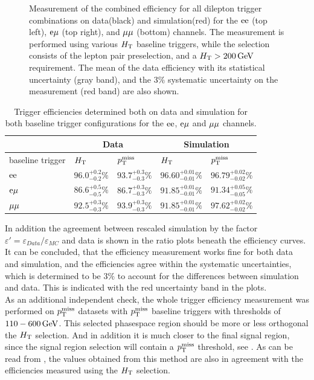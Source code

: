 \begin{figure}[htb]
 \caption{Measurement of the combined efficiency for all dilepton trigger combinations on data(black) and simulation(red) for the $\mathrm{e}\mathrm{e}$ (top left), $\mathrm{e}\mu$ (top right), and $\mu\mu$ (bottom) channels. The measurement is performed using various $H_{\mathrm{T}}$ baseline triggers, while the selection consists of the lepton pair preselection, and a $H_{\mathrm{T}}>200\,\text{Ge\hspace{-.08em}V}$ requirement. The mean of the data efficiency with its statistical uncertainty (gray band), and the $3\%$ systematic uncertainty on the measurement (red band) are also shown.}
 \label{fig:triggEff}
\end{figure}


\begin{table}[htb]
 \centering
 \caption{Trigger efficiencies determined both on data and simulation for both baseline trigger
  configurations for the $\mathrm{e}\mathrm{e}$, $\mathrm{e}{\mu}$ and ${\mu}{\mu}$ channels.}
 \label{tab:triggEff}
 \begin{tabular}{lllll}
                   & \multicolumn{2}{c}{Data} & \multicolumn{2}{c}{Simulation}                                                         \\\hline
  baseline trigger & $H_{\mathrm{T}}$                    & $p_{\mathrm{T}}^\text{miss}$                      & $H_{\mathrm{T}}$                     & $p_{\mathrm{T}}^\text{miss}$                 \\\hline
  $\mathrm{e}\mathrm{e}$         & $96.0^{+0.2}_{-0.2}\%$   & $93.7^{+0.3}_{-0.3}\%$         & $96.60^{+0.01}_{-0.01}\%$ & $96.79^{+0.02}_{-0.02}\%$ \\
  $\mathrm{e}{\mu}$        & $86.6^{+0.5}_{-0.5}\%$   & $86.7^{+0.3}_{-0.3}\%$         & $91.85^{+0.01}_{-0.01}\%$ & $91.34^{+0.05}_{-0.05}\%$ \\
  ${\mu}{\mu}$       & $92.5^{+0.3}_{-0.3}\%$   & $93.9^{+0.3}_{-0.3}\%$         & $91.85^{+0.01}_{-0.01}\%$ & $97.62^{+0.02}_{-0.02}\%$ \\\hline
 \end{tabular}
\end{table}


In addition the agreement between rescaled simulation by the factor $\varepsilon'=\varepsilon_{Data}/\varepsilon_{MC}$ and data is shown in the ratio plots beneath the efficiency curves. It can be concluded, that the efficiency measurement works fine for both data and simulation, and the efficiencies agree within the systematic uncertainties, which is determined to be $3\%$ to account for the differences between simulation and data. This is indicated with the red uncertainty band in the plots.\\
As an additional independent check, the whole trigger efficiency measurement was performed on $p_{\mathrm{T}}^\text{miss}$ datasets with $p_{\mathrm{T}}^\text{miss}$ baseline triggers with thresholds of $110-600\,\text{Ge\hspace{-.08em}V}$. This selected phasespace region should be more or less orthogonal the $H_{\mathrm{T}}$ selection. And in addition it is much closer to the final signal region, since the signal region selection will contain a $p_{\mathrm{T}}^\text{miss}$ threshold, see . As can be read from , the values obtained from this method are also in agreement with the efficiencies measured using the $H_{\mathrm{T}}$ selection.
